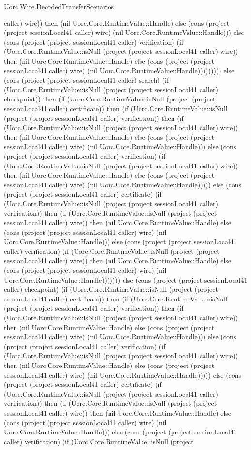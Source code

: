 \begin{lexlean}{Uorc.Wire.DecodedTransferScenarios}
\begin{semanticmodule}
{caller) wire)) then (nil Uorc.Core.RuntimeValue::Handle) else (cons (project (project sessionLocal41 caller) wire) (nil Uorc.Core.RuntimeValue::Handle))) else (cons (project (project sessionLocal41 caller) verification) (if (Uorc.Core.RuntimeValue::isNull (project (project sessionLocal41 caller) wire)) then (nil Uorc.Core.RuntimeValue::Handle) else (cons (project (project sessionLocal41 caller) wire) (nil Uorc.Core.RuntimeValue::Handle))))))))) else (cons (project (project sessionLocal41 caller) search) (if (Uorc.Core.RuntimeValue::isNull (project (project sessionLocal41 caller) checkpoint)) then (if (Uorc.Core.RuntimeValue::isNull (project (project sessionLocal41 caller) certificate)) then (if (Uorc.Core.RuntimeValue::isNull (project (project sessionLocal41 caller) verification)) then (if (Uorc.Core.RuntimeValue::isNull (project (project sessionLocal41 caller) wire)) then (nil Uorc.Core.RuntimeValue::Handle) else (cons (project (project sessionLocal41 caller) wire) (nil Uorc.Core.RuntimeValue::Handle))) else (cons (project (project sessionLocal41 caller) verification) (if (Uorc.Core.RuntimeValue::isNull (project (project sessionLocal41 caller) wire)) then (nil Uorc.Core.RuntimeValue::Handle) else (cons (project (project sessionLocal41 caller) wire) (nil Uorc.Core.RuntimeValue::Handle))))) else (cons (project (project sessionLocal41 caller) certificate) (if (Uorc.Core.RuntimeValue::isNull (project (project sessionLocal41 caller) verification)) then (if (Uorc.Core.RuntimeValue::isNull (project (project sessionLocal41 caller) wire)) then (nil Uorc.Core.RuntimeValue::Handle) else (cons (project (project sessionLocal41 caller) wire) (nil Uorc.Core.RuntimeValue::Handle))) else (cons (project (project sessionLocal41 caller) verification) (if (Uorc.Core.RuntimeValue::isNull (project (project sessionLocal41 caller) wire)) then (nil Uorc.Core.RuntimeValue::Handle) else (cons (project (project sessionLocal41 caller) wire) (nil Uorc.Core.RuntimeValue::Handle))))))) else (cons (project (project sessionLocal41 caller) checkpoint) (if (Uorc.Core.RuntimeValue::isNull (project (project sessionLocal41 caller) certificate)) then (if (Uorc.Core.RuntimeValue::isNull (project (project sessionLocal41 caller) verification)) then (if (Uorc.Core.RuntimeValue::isNull (project (project sessionLocal41 caller) wire)) then (nil Uorc.Core.RuntimeValue::Handle) else (cons (project (project sessionLocal41 caller) wire) (nil Uorc.Core.RuntimeValue::Handle))) else (cons (project (project sessionLocal41 caller) verification) (if (Uorc.Core.RuntimeValue::isNull (project (project sessionLocal41 caller) wire)) then (nil Uorc.Core.RuntimeValue::Handle) else (cons (project (project sessionLocal41 caller) wire) (nil Uorc.Core.RuntimeValue::Handle))))) else (cons (project (project sessionLocal41 caller) certificate) (if (Uorc.Core.RuntimeValue::isNull (project (project sessionLocal41 caller) verification)) then (if (Uorc.Core.RuntimeValue::isNull (project (project sessionLocal41 caller) wire)) then (nil Uorc.Core.RuntimeValue::Handle) else (cons (project (project sessionLocal41 caller) wire) (nil Uorc.Core.RuntimeValue::Handle))) else (cons (project (project sessionLocal41 caller) verification) (if (Uorc.Core.RuntimeValue::isNull (project }
\end{semanticmodule}
\end{lexlean}
